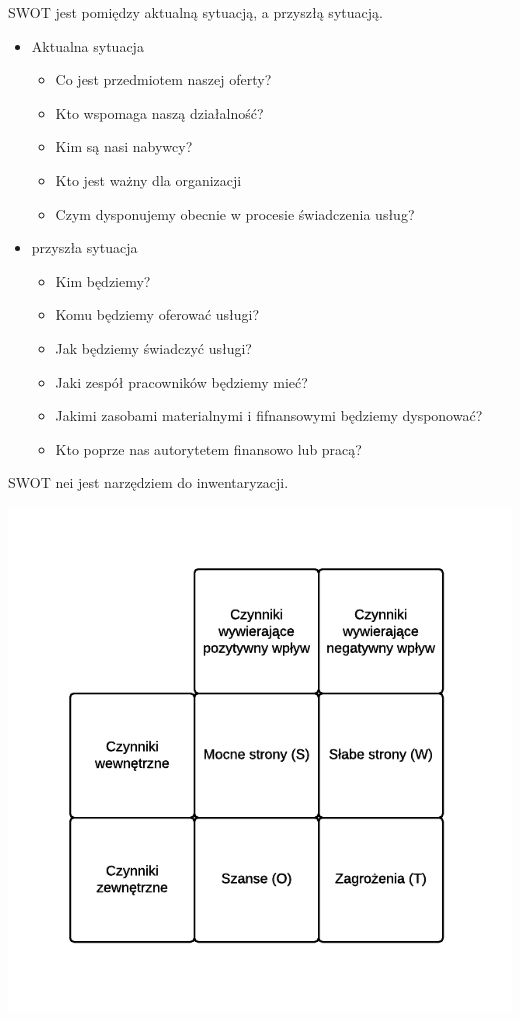 \documentclass[a4paper,10pt]{report}
\begin{document}
SWOT jest pomiędzy aktualną sytuacją, a przyszłą sytuacją.
\begin{itemize}
	\item Aktualna sytuacja
	\begin{itemize}
		\item Co jest przedmiotem naszej oferty?
		\item Kto wspomaga naszą działalność?
		\item Kim są nasi nabywcy?
		\item Kto jest ważny dla organizacji
		\item Czym dysponujemy obecnie w procesie świadczenia usług?
	\end{itemize}
	\item przyszła sytuacja
	\begin{itemize}
		\item Kim będziemy?
		\item Komu będziemy oferować usługi?
		\item Jak będziemy świadczyć usługi?
		\item Jaki zespół pracowników będziemy mieć?
		\item Jakimi zasobami materialnymi i fifnansowymi będziemy dysponować?
		\item Kto poprze nas autorytetem finansowo lub pracą?
	\end{itemize}
\end{itemize}

SWOT nei jest narzędziem do inwentaryzacji.

\begin{center}
\includegraphics[scale=0.87]{assets/SWOT}
\end{center}
\end{document}
